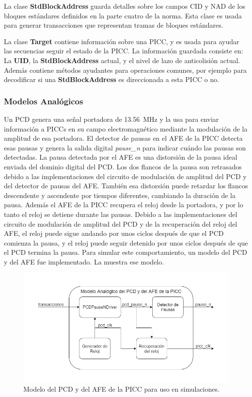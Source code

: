\documentclass[a4paper, twoside, 11pt]{report}
\begin{document}
La clase \textbf{StdBlockAddress} guarda detalles sobre los campos CID y NAD de los bloques estándares definidos en la parte cuatro de la norma. Esta clase es usada para generar transacciones que representan tramas de bloques estándares.

La clase \textbf{Target} contiene información sobre una PICC, y es usada para ayudar las secuencias seguir el estado de la PICC. La información guardada consiste en: La \textbf{UID}, la \textbf{StdBlockAddress} actual, y el nivel de lazo de anticolisión actual. Además contiene métodos ayudantes para operaciones comunes, por ejemplo para decodificar si una \textbf{StdBlockAddress} es direccionada a esta PICC o no.

\FloatBarrier
\subsubsection{Modelos Analógicos}

Un PCD genera una señal portadora de \SI{13.56}{\mega\hertz} y la usa para enviar información a PICCs en su campo electromagnético mediante la modulación de la amplitud de esa portadora. El detector de pausas en el AFE de la PICC detecta esas pausas y genera la salida digital \textit{pause\_n} para indicar cuándo las pausas son detectadas. La pausa detectada por el AFE es una distorsión de la pausa ideal enviada del dominio digital del PCD. Los dos flancos de la pausa son retrasados debido a las implementaciones del circuito de modulación de amplitud del PCD y del detector de pausas del AFE. También esa distorsión puede retardar los flancos descendente y ascendente por tiempos diferentes, cambiando la duración de la pausa. Además el AFE de la PICC recupera el reloj desde la portadora, y por lo tanto el reloj se detiene durante las pausas. Debido a las implementaciones del circuito de modulación de amplitud del PCD y de la recuperación del reloj del AFE, el reloj puede sigue andando por unos ciclos después de que el PCD comienza la pausa, y el reloj puede seguir detenido por unos ciclos después de que el PCD termina la pausa. Para simular este comportamiento, un modelo del PCD y del AFE fue implementado. La  muestra ese modelo. 

\begin{figure}[htb]
  \centering
  \includegraphics[width=1.0\textwidth]{./img/analogue_model}
  \caption{Modelo del PCD y del AFE de la PICC para uso en simulaciones.}
  \label{fig:analog_model}
\end{figure}
\end{document}
